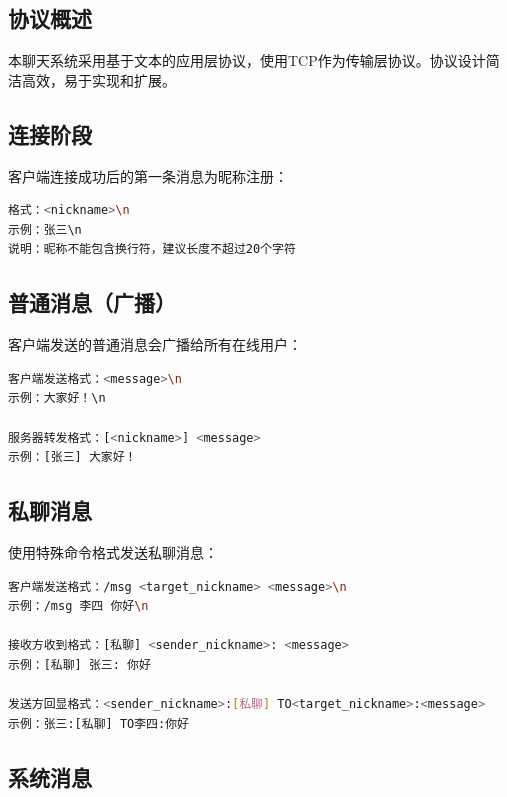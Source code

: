 \documentclass[12pt, a4paper]{article}
\begin{document}
\subsection*{协议概述}

本聊天系统采用基于文本的应用层协议，使用TCP作为传输层协议。协议设计简洁高效，易于实现和扩展。



\subsection*{连接阶段}

客户端连接成功后的第一条消息为昵称注册：

\begin{lstlisting}[language=bash]
格式：<nickname>\n
示例：张三\n
说明：昵称不能包含换行符，建议长度不超过20个字符
\end{lstlisting}

\subsection*{普通消息（广播）}

客户端发送的普通消息会广播给所有在线用户：

\begin{lstlisting}[language=bash]
客户端发送格式：<message>\n
示例：大家好！\n

服务器转发格式：[<nickname>] <message>
示例：[张三] 大家好！
\end{lstlisting}

\subsection*{私聊消息}

使用特殊命令格式发送私聊消息：

\begin{lstlisting}[language=bash]
客户端发送格式：/msg <target_nickname> <message>\n
示例：/msg 李四 你好\n

接收方收到格式：[私聊] <sender_nickname>: <message>
示例：[私聊] 张三: 你好

发送方回显格式：<sender_nickname>:[私聊] TO<target_nickname>:<message>
示例：张三:[私聊] TO李四:你好
\end{lstlisting}

\subsection*{系统消息}
\end{document}
